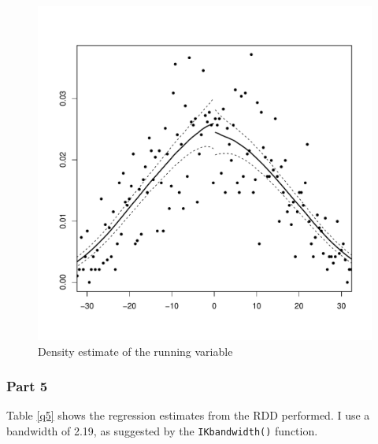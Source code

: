 \documentclass{article}\usepackage[]{graphicx}\usepackage[]{color}
\newenvironment{knitrout}{}{} %
\newenvironment{centerfig}
{\begin{figure}[H]\centering}
{\end{figure}}
\begin{document}
\begin{centerfig}
\caption{Density estimate of the running variable}
\begin{knitrout}
\color{fgcolor}
\includegraphics[width=1\linewidth]{figure/unnamed-chunk-5-1} 

\end{knitrout}
\end{centerfig}

\subsubsection{Part 5}
\label{rdd_lm}

Table \ref{q5} shows the regression estimates from the RDD performed. I use a bandwidth of 2.19, as suggested by the
\lstinline{IKbandwidth()} function.
\end{document}

